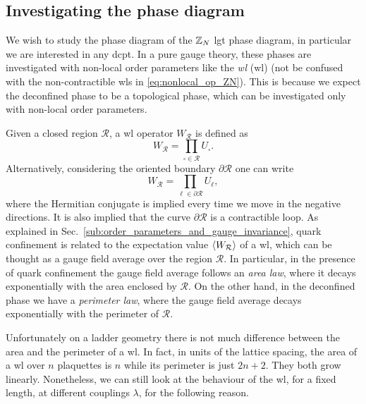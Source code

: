 \subsection{Investigating the phase diagram}%
\label{sub:investigating_the_phase_diagram}

We wish to study the phase diagram of the $\mathbb{Z}_N$ \ac{lgt} phase diagram, in particular we are interested in any \ac{dcpt}.
In a pure gauge theory, these phases are investigated with non-local order parameters like the \emph{\ac{wl}} (\ac{wl}) (not be confused with the non-contractible \ac{wl}s in \eqref{eq:nonlocal_op_ZN}).
This is because we expect the deconfined phase to be a topological phase, which can be investigated only with non-local order parameters.

Given a closed region $\mathcal{R}$, a \ac{wl} operator $W_{\mathcal{R}}$ is defined as
\begin{equation}
    W_{\mathcal{R}} = \prod_{\square \in \mathcal{R}} U_{\square}.
    \label{eq:closed_wilson_loop}
\end{equation}
Alternatively, considering the oriented boundary $\partial \mathcal{R}$ one can write
\begin{equation}
    W_{\mathcal{R}} = \prod_{\ell \in \partial \mathcal{R}} U_{\ell},
\end{equation}
where the Hermitian conjugate is implied every time we move in the negative directions.
It is also implied that the curve $\partial \mathcal{R}$ is a contractible loop.
As explained in Sec.~\ref{sub:order_parameters_and_gauge_invariance}, quark confinement is related to the expectation value $\ev{W_{\mathcal{R}}}$ of a \ac{wl}, which can be thought as a gauge field average over the region $\mathcal{R}$.
In particular, in the presence of quark confinement the gauge field average follows an \emph{area law}, where it decays exponentially with the area enclosed by $\mathcal{R}$.
On the other hand, in the deconfined phase we have a \emph{perimeter law}, where the gauge field average decays exponentially with the perimeter of $\mathcal{R}$.

Unfortunately on a ladder geometry there is not much difference between the area and the perimeter of a \ac{wl}.
In fact, in units of the lattice spacing, the area of a \ac{wl} over $n$ plaquettes is $n$ while its perimeter is just $2n+2$.
They both grow linearly.
Nonetheless, we can still look at the behaviour of the \ac{wl}, for a fixed length, at different couplings $\lambda$, for the following reason.


